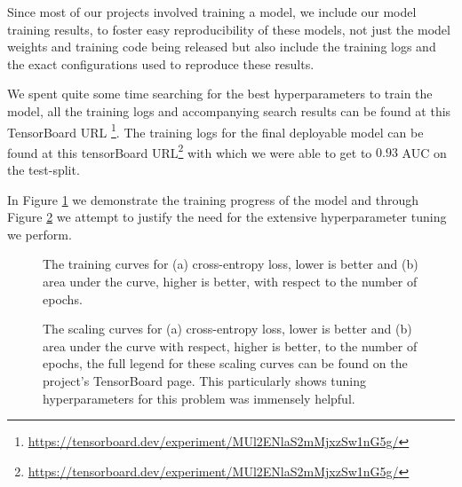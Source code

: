 \documentclass[fontsize=11pt]{article}
\begin{document}
Since most of our projects involved training a model, we include our model training results, to foster easy reproducibility of these models, not just the model weights and training code being released but also include the training logs and the exact configurations used to reproduce these results.

We spent quite some time searching for the best hyperparameters to train the model, all the training logs and accompanying search results can be found at 
 this TensorBoard URL \footnote{\url{https://tensorboard.dev/experiment/MUl2ENlaS2mMjxzSw1nG5g/}}. The training logs for the final deployable model can be found at this tensorBoard URL\footnote{\url{https://tensorboard.dev/experiment/MUl2ENlaS2mMjxzSw1nG5g/}} with which we were able to get to $0.93$ AUC on the test-split.

In Figure \ref{fig:training_logs} we demonstrate the training progress of the model and through Figure \ref{fig:scaling_logs} we attempt to justify the need for the extensive hyperparameter tuning we perform.

\begin{figure}[htbp]
  \centering
  \begin{minipage}{0.45\textwidth}
    \centering
    
    \subcaption{}
  \end{minipage}\hfill
  \begin{minipage}{0.45\textwidth}
    \centering
    
    \subcaption{}
  \end{minipage}
  \caption{The training curves for (a) cross-entropy loss, lower is better and (b) area under the curve, higher is better, with respect to the number of epochs.}
  \label{fig:training_logs}
\end{figure}

\begin{figure}[htbp]
  \centering
  \begin{minipage}{0.45\textwidth}
    \centering
    
    \subcaption{}
  \end{minipage}\hfill
  \begin{minipage}{0.45\textwidth}
    \centering
    
    \subcaption{}
  \end{minipage}
  \caption{The scaling curves for (a) cross-entropy loss, lower is better and (b) area under the curve with respect, higher is better, to the number of epochs, the full legend for these scaling curves can be found on the project's TensorBoard page. This particularly shows tuning hyperparameters for this problem was immensely helpful.}
  \label{fig:scaling_logs}
\end{figure}
\end{document}
